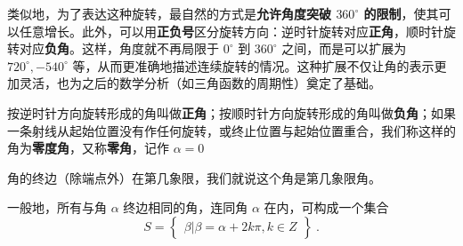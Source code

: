 类似地，为了表达这种旋转，最自然的方式是\textbf{允许角度突破 $360^\circ$ 的限制}，使其可以任意增长。此外，可以用\textbf{正负号}区分旋转方向：逆时针旋转对应\textbf{正角}，顺时针旋转对应\textbf{负角}。这样，角度就不再局限于 $0^\circ$ 到 $360^\circ$ 之间，而是可以扩展为 $720^\circ, -540^\circ$ 等，从而更准确地描述连续旋转的情况。这种扩展不仅让角的表示更加灵活，也为之后的数学分析（如三角函数的周期性）奠定了基础。


按逆时针方向旋转形成的角叫做\textbf{正角}；按顺时针方向旋转形成的角叫做\textbf{负角}；如果一条射线从起始位置没有作任何旋转，或终止位置与起始位置重合，我们称这样的角为\textbf{零度角}，又称\textbf{零角}，记作 $\alpha = 0$

角的终边（除端点外）在第几象限，我们就说这个角是第几象限角。

一般地，所有与角 $\alpha$ 终边相同的角，连同角 $\alpha$ 在内，可构成一个集合
\begin{equation}
S = \begin{Bmatrix} \beta|\beta=\alpha+2k\pi,k \in Z \end{Bmatrix}~.
\end{equation}


